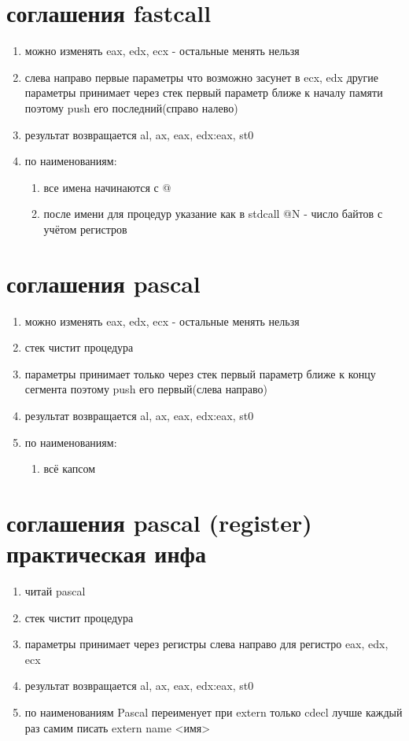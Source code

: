 \documentclass[a4paper,10pt]{article}
\begin{document}
\section*{соглашения fastcall}
\begin{enumerate}
    \item можно изменять eax, edx, ecx - остальные менять нельзя 
    \item слева направо первые параметры что возможно засунет в ecx, edx другие параметры принимает через стек первый параметр ближе к началу памяти поэтому push его последний(справо налево)
    \item результат возвращается al, ax, eax, edx:eax, st0
    \item по наименованиям:
    \begin{enumerate}
        \item все имена начинаются с @
        \item после имени для процедур указание как в stdcall @N - число байтов с учётом регистров
    \end{enumerate}
\end{enumerate}
\section*{соглашения pascal}
\begin{enumerate}
    \item можно изменять eax, edx, ecx - остальные менять нельзя
    \item стек чистит процедура 
    \item параметры принимает только через стек первый параметр ближе к концу сегмента поэтому push его первый(слева направо)
    \item результат возвращается al, ax, eax, edx:eax, st0
    \item по наименованиям:
    \begin{enumerate}
        \item всё капсом
    \end{enumerate}
\end{enumerate}
\section*{соглашения pascal (register) практическая инфа}
\begin{enumerate}
    \item читай pascal
    \item стек чистит процедура 
    \item параметры принимает через регистры слева направо для регистро eax, edx, ecx 
    \item результат возвращается al, ax, eax, edx:eax, st0
    \item по наименованиям Pascal переименует при extern только cdecl лучше каждый раз самим писать extern name <имя>
\end{enumerate}
\end{document}
